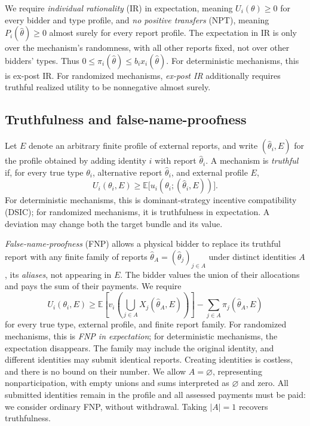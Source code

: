\documentclass[format=acmsmall, review=false]{acmart}
\begin{document}
We require \emph{individual rationality} (IR) in expectation,
meaning $U_i(\theta)\ge0$ for every bidder and type profile, and
\emph{no positive transfers} (NPT), meaning
$P_i(\hat\theta)\ge0$ almost surely for every report profile.
The expectation in IR is only over the mechanism's randomness,
with all other reports fixed, not over other bidders' types.
Thus $0\le\pi_i(\hat\theta)\le b_i x_i(\hat\theta)$.
For deterministic mechanisms, this is ex-post IR. For randomized
mechanisms, \emph{ex-post IR} additionally requires truthful
realized utility to be nonnegative almost surely.

\subsection{Truthfulness and false-name-proofness}

Let $E$ denote an arbitrary finite profile of external reports,
and write $(\hat\theta_i,E)$ for the profile obtained by adding
identity $i$ with report $\hat\theta_i$. A mechanism is
\emph{truthful} if, for every true type $\theta_i$, alternative
report $\hat\theta_i$, and external profile $E$,
\[
U_i(\theta_i,E)
\ge
\mathbb{E}\bigl[u_i(\theta_i;(\hat\theta_i,E))\bigr].
\]
For deterministic mechanisms, this is dominant-strategy
incentive compatibility (DSIC); for randomized mechanisms, it is
truthfulness in expectation. A deviation may change both the
target bundle and its value.

\emph{False-name-proofness} (FNP) allows a physical bidder to
replace its truthful report with any finite family of reports
$\hat\theta_A=(\hat\theta_j)_{j\in A}$ under distinct identities
$A$, its \emph{aliases}, not appearing in
$E$. The bidder values the union of their allocations and pays
the sum of their payments. We require
\[
U_i(\theta_i,E)
\ge
\mathbb{E}\!\left[
  v_i\!\left(\bigcup_{j\in A}X_j(\hat\theta_A,E)\right)
\right]
-\sum_{j\in A}\pi_j(\hat\theta_A,E)
\]
for every true type, external profile, and finite report family.
For randomized mechanisms, this is \emph{FNP in expectation};
for deterministic mechanisms, the expectation disappears.
The family may include the original identity, and different
identities may submit identical reports. Creating identities
is costless, and there is no bound on their number. We allow
$A=\varnothing$, representing nonparticipation, with empty unions
and sums interpreted as $\varnothing$ and zero. All submitted
identities remain in the profile and all assessed payments must
be paid: we consider ordinary FNP, without withdrawal. Taking
$|A|=1$ recovers truthfulness.
\end{document}
